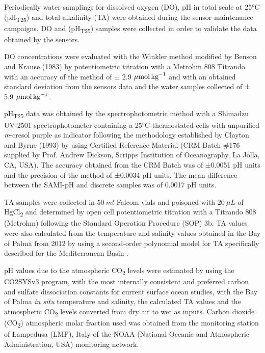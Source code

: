 Periodically water samplings for dissolved oxygen (DO), pH in total scale
at 25°C (pH\textsubscript{T25}) and total alkalinity (TA) were obtained during
the sensor maintenance campaigns. DO and (pH\textsubscript{T25}) samples were
collected in order to validate the data obtained by the sensors.

DO concentrations were evaluated with the Winkler method modified by Benson
and Krause (1983) \cite{Benson_Krause_1984} by potentiometric titration with a
Metrohm 808 Titrando with an accuracy of the method of ± 2.9 ${\mu
            \textrm{mol\,kg}^{-1}}$ and with an obtained standard deviation
from the
sensors data and the water samples collected of ± 5.9 ${\mu
            \textrm{mol\,kg}^{-1}}$.

pH\textsubscript{T25} data was obtained by the spectrophotometric method
with a Shimadzu UV-2501 spectrophotometer containing a 25°C-thermostated cells
with unpurified \emph{m}-cresol purple as indicator following the methodology
established by Clayton and Byrne (1993)\cite{Clayton_Byrne_1993} by using
Certified Reference  Material (CRM Batch \#176 supplied by Prof.  Andrew
Dickson, Scripps  Institution  of  Oceanography, La  Jolla,  CA,  USA). The
accuracy obtained from the CRM Batch was of ±0.0051 pH units and the precision
of the method  of ±0.0034 pH units. The mean difference between the SAMI-pH and
discrete samples was of 0.0017 pH units.

TA samples were collected in $\SI{50}{ml}$ Falcom vials and poisoned with
$\SI{20}{\mu L}$ of HgCl\textsubscript{2} and determined by open cell
potentiometric titration with a Titrando 808 (Metrohm) following the Standard
Operation Procedure (SOP) 3b\cite{Dickson2007}.
TA values were also calculated from the temperature and salinity values
obtained in the Bay of Palma from 2012 by using a second-order polynomial model
for TA specifically described for the Mediterranean Basin \cite{Gemayel2015}.

pH values due to the atmospheric CO\textsubscript{2} levels were estimated
by using the CO2SYSv3 program\cite{Sharp2020}, with the most internally
consistent and preferred carbon \cite{mehrbach1973,dickson1987} and sulfate
dissociation constants\cite{dickson1990} for current surface ocean
studies\cite{woosley2021}, with the Bay of Palma \emph{in situ} temperature and
salinity, the calculated TA values and the atmospheric CO\textsubscript{2}
levels converted from dry air to wet\cite{weiss1980nitrous} as inputs. Carbon
dioxide (CO\textsubscript{2}) atmospheric molar fraction used was obtained from
the monitoring station of Lampedusa (LMP), Italy of the NOAA (National Oceanic
and Atmospheric Administration, USA) monitoring network\cite{Duglokencky2021}.

